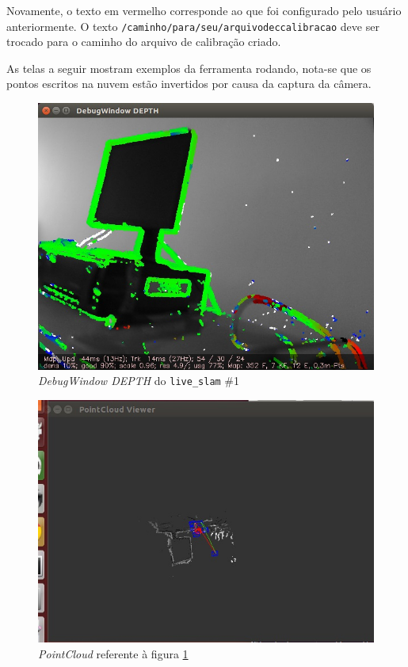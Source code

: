 Novamente, o texto em vermelho corresponde ao que foi configurado pelo usuário anteriormente. O texto \texttt{/caminho/para/seu/arquivodeccalibracao} deve ser trocado para o caminho do arquivo de calibração criado.

As telas a seguir mostram exemplos da ferramenta rodando, nota-se que os pontos escritos na nuvem estão invertidos por causa da captura da câmera. 

\begin{figure}[!htb]
	\centering
		\includegraphics[width= \textwidth]{Imagens/figura3-20.jpg}
	\caption{\textit{DebugWindow DEPTH} do \texttt{live\_slam} \#1}
	\label{fig3:20}
\end{figure}

\begin{figure}[!htb]
	\centering
		\includegraphics[width= \textwidth]{Imagens/figura3-21.jpg}
	\caption{\textit{PointCloud} referente à figura \ref{fig3:20}}
	\label{fig3:21}
\end{figure}

